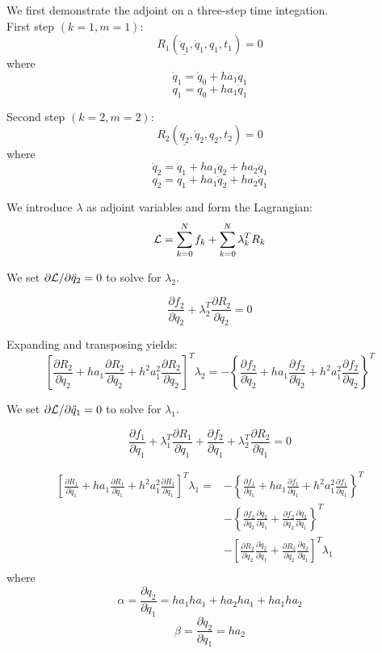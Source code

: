 \documentclass{beamer}
\newcommand{\pd}[2]{\frac{\partial #1}{\partial #2}}
\begin{document}
\begin{frame}[allowframebreaks]
  \framebreak

  We first demonstrate the adjoint on a three-step time integation. \\

  First step $(k=1, m=1)$: $$R_1(\underline{\ddot{q}_1}, \dot{q}_1, q_1, t_1) = 0$$
  where
  $$ \dot{q}_1  = \dot{q}_{0}  + h a_1 \ddot{q}_{1}$$ 
  $$     {q}_1  =     {q}_{0}  + h a_1 \dot{q}_{1}$$ 

  Second step $(k=2, m=2)$: $$R_2(\underline{\ddot{q}_2}, \dot{q}_2, q_2, t_2) = 0$$
  where
  $$ \dot{q}_2  = \dot{q}_{1}  + h a_1 \ddot{q}_{2} + h a_2 \ddot{q}_{1} $$ 
  $$     {q}_2  =     {q}_{1}  + h a_1 \dot{q}_{2}  + h a_2 \dot{q}_{1} $$ 

  We introduce $\lambda$ as adjoint variables and form the Lagrangian: $$ {\cal L} = \sum_{k=0}^N f_k + \sum_{k=0}^N \lambda_k^T R_k $$

  We set $\partial{\cal{L}}/\partial{\ddot{q}_2}=0$ to solve for $\lambda_2$.
  
  $$\pd{f_2}{\ddot{q}_2} + \lambda_2^T \pd{R_2}{\ddot{q}_2} = 0$$

  Expanding and transposing yields:
  $$
  \left[ \pd{R_2}{\ddot{q}_2} + ha_1 \pd{R_2}{\dot{q}_2} + h^2a_1^2 \pd{R_2}{{q}_2} \right]^T \lambda_2 = - \left\{ \pd{f_2}{\ddot{q}_2} + ha_1 \pd{f_2}{\dot{q}_2} + h^2a_1^2 \pd{f_2}{{q}_2} \right\}^T 
  $$
  
  \framebreak

  We set $\partial{\cal{L}}/\partial{\ddot{q}_1}=0$ to solve for $\lambda_1$. 
  
  $$\pd{f_1}{\ddot{q}_1} + \lambda_1^T \pd{R_1}{\ddot{q}_1} 
  + \pd{f_2}{\ddot{q}_1} + \lambda_2^T \pd{R_2}{\ddot{q}_1} = 0$$

\begin{equation}\nonumber
\begin{split}
  \left[ \pd{R_1}{\ddot{q}_1} + ha_1 \pd{R_1}{\dot{q}_1} + h^2a_1^2 \pd{R_1}{{q}_1} \right]^T \lambda_1  = &
  - \left\{ \pd{f_1}{\ddot{q}_1} + ha_1 \pd{f_1}{\dot{q}_1} + h^2a_1^2 \pd{f_1}{{q}_1} \right\}^T \\
  & - \left\{ \pd{f_2}{\dot{q}_2} \pd{\dot{q}_2}{\ddot{q}_1} +  \pd{f_2}{{q}_2} \pd{{q}_2}{\ddot{q}_1} \right\}^T\\
  & - \left[  \pd{R_2}{\dot{q}_2} \pd{\dot{q}_2}{\ddot{q}_1} +  \pd{R_2}{{q}_2} \pd{{q}_2}{\ddot{q}_1} \right]^T \lambda_1 \\
\end{split}
\end{equation}
where
$$\alpha=\pd{q_2}{\ddot{q}_1} = ha_1ha_1 + ha_2ha_1 + ha_1ha_2$$
$$
\beta=\pd{\dot{q}_2}{\ddot{q}_1} = ha_2
$$
\end{frame}
\end{document}
